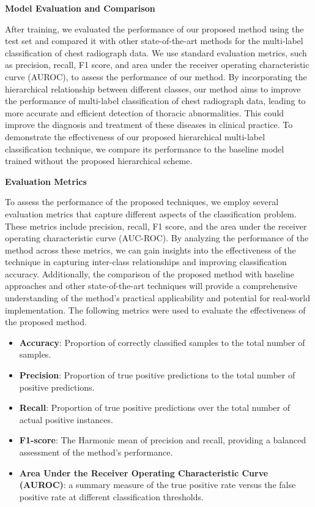 \textbf{Model Evaluation and Comparison}

After training, we evaluated the performance of our proposed method using the test set and compared it with other state-of-the-art methods for the multi-label classification of chest radiograph data. We use standard evaluation metrics, such as precision, recall, F1 score, and area under the receiver operating characteristic curve (AUROC), to assess the performance of our method. By incorporating the hierarchical relationship between different classes, our method aims to improve the performance of multi-label classification of chest radiograph data, leading to more accurate and efficient detection of thoracic abnormalities. This could improve the diagnosis and treatment of these diseases in clinical practice. To demonstrate the effectiveness of our proposed hierarchical multi-label classification technique, we compare its performance to the baseline model trained without the proposed hierarchical scheme.

\textbf{Evaluation Metrics}

To assess the performance of the proposed techniques, we employ several evaluation metrics that capture different aspects of the classification problem. These metrics include precision, recall, F1 score, and the area under the receiver operating characteristic curve (AUC-ROC). By analyzing the performance of the method across these metrics, we can gain insights into the effectiveness of the technique in capturing inter-class relationships and improving classification accuracy. Additionally, the comparison of the proposed method with baseline approaches and other state-of-the-art techniques will provide a comprehensive understanding of the method's practical applicability and potential for real-world implementation. The following metrics were used to evaluate the effectiveness of the proposed method.

\begin{itemize}
    \item \textbf{Accuracy}: Proportion of correctly classified samples to the total number of samples.

    \item \textbf{Precision}: Proportion of true positive predictions to the total number of positive predictions.

    \item \textbf{Recall}: Proportion of true positive predictions over the total number of actual positive instances.

    \item \textbf{F1-score}: The Harmonic mean of precision and recall, providing a balanced assessment of the method's performance.

    \item \textbf{Area Under the Receiver Operating Characteristic Curve (AUROC)}: a summary measure of the true positive rate versus the false positive rate at different classification thresholds.
\end{itemize}


